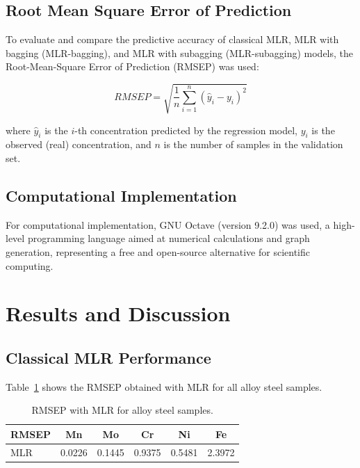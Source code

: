 \documentclass[12pt]{article}
\begin{document}
\subsection{Root Mean Square Error of Prediction}

To evaluate and compare the predictive accuracy of classical MLR, MLR with bagging (MLR-bagging), and MLR with subagging (MLR-subagging) models, the Root-Mean-Square Error of Prediction (RMSEP) was used:

\begin{equation}
RMSEP = \sqrt{\frac{1}{n}\sum_{i=1}^{n}(\hat{y}_i - y_i)^2}
\end{equation}

\noindent where $\hat{y}_i$ is the $i$-th concentration predicted by the regression model, $y_i$ is the observed (real) concentration, and $n$ is the number of samples in the validation set.

\subsection{Computational Implementation}

For computational implementation, GNU Octave (version 9.2.0) was used, a high-level programming language aimed at numerical calculations and graph generation, representing a free and open-source alternative for scientific computing.\cite{liu2025}

\section{Results and Discussion}

\subsection{Classical MLR Performance}

Table~\ref{tab:mlr_results} shows the RMSEP obtained with MLR for all alloy steel samples.

\begin{table}[H]
\centering
\caption{RMSEP with MLR for alloy steel samples.}
\label{tab:mlr_results}
\begin{tabular}{lccccc}
\toprule
RMSEP & Mn & Mo & Cr & Ni & Fe \\
\midrule
MLR & 0.0226 & 0.1445 & 0.9375 & 0.5481 & 2.3972 \\
\bottomrule
\end{tabular}
\end{table}
\end{document}
